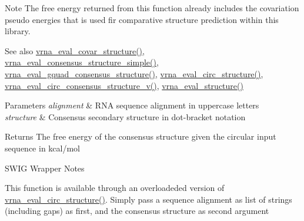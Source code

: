\begin{DoxyNote}{Note}
The free energy returned from this function already includes the covariation pseudo energies that is used fir comparative structure prediction within this library.
\end{DoxyNote}
\begin{DoxySeeAlso}{See also}
\mbox{\hyperlink{group__eval_ga6cea75c0eb9857fb59172be54cab09e0}{vrna\+\_\+eval\+\_\+covar\+\_\+structure()}}, \mbox{\hyperlink{group__eval_ga7762c3a7bdcbc3a14ef93259d322c7d6}{vrna\+\_\+eval\+\_\+consensus\+\_\+structure\+\_\+simple()}}, \mbox{\hyperlink{group__eval_gaf09a326b3d57a4b30c27bd0e216198ac}{vrna\+\_\+eval\+\_\+gquad\+\_\+consensus\+\_\+structure()}}, \mbox{\hyperlink{group__eval_ga3e05a23ddf9b083f4e69881e440d4866}{vrna\+\_\+eval\+\_\+circ\+\_\+structure()}}, \mbox{\hyperlink{group__eval_gae89240c230e4740b22a703ee953396b9}{vrna\+\_\+eval\+\_\+circ\+\_\+consensus\+\_\+structure\+\_\+v()}}, \mbox{\hyperlink{group__eval_ga58f199f1438d794a265f3b27fc8ea631}{vrna\+\_\+eval\+\_\+structure()}}
\end{DoxySeeAlso}

\begin{DoxyParams}{Parameters}
{\em alignment} & R\+NA sequence alignment in uppercase letters \\
\hline
{\em structure} & Consensus secondary structure in dot-\/bracket notation \\
\hline
\end{DoxyParams}
\begin{DoxyReturn}{Returns}
The free energy of the consensus structure given the circular input sequence in kcal/mol
\end{DoxyReturn}
\begin{DoxyRefDesc}{S\+W\+I\+G Wrapper Notes}
\item[\mbox{\hyperlink{wrappers__wrappers000040}{S\+W\+I\+G Wrapper Notes}}]This function is available through an overloadeded version of \mbox{\hyperlink{group__eval_ga3e05a23ddf9b083f4e69881e440d4866}{vrna\+\_\+eval\+\_\+circ\+\_\+structure()}}. Simply pass a sequence alignment as list of strings (including gaps) as first, and the consensus structure as second argument \end{DoxyRefDesc}
\mbox{\label{group__eval_gaf09a326b3d57a4b30c27bd0e216198ac}} 
